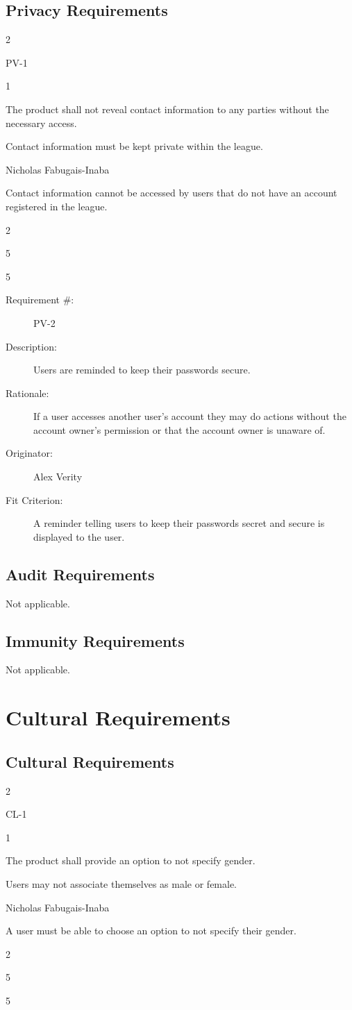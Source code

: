 \documentclass[12pt]{article}
\newenvironment{myreq}[1]{%
\setlist[description]{font=\normalfont\color{darkgray}}%
\begin{tcolorbox}[colframe=black,colback=white, sharp corners, boxrule=1pt]%
\bfseries\color{blue}%
\begin{description}#1}%
{\end{description}\end{tcolorbox}}
\newcommand{\twoinline}[2]{\begin{multicols}{2}#1 #2\end{multicols}}
\newcommand{\reqno}{\item[Requirement \#:]}
\newcommand{\reqevent}{\item[Event/BUC/PUC \#:]}
\newcommand{\reqdesc}{\item[Description:]}
\newcommand{\reqrat}{\item[Rationale:]}
\newcommand{\reqorig}{\item[Originator:]}
\newcommand{\reqfit}{\item[Fit Criterion:]}
\newcommand{\reqsatis}{\item[Customer Satisfaction:]}
\newcommand{\reqdissat}{\item[Customer Dissatisfaction:]}
\begin{document}
\subsection{Privacy Requirements}

\begin{myreq}
  \twoinline
    {\reqno PV-1}
    {\reqevent 1}
  \reqdesc The product shall not reveal contact information to any
  parties without the necessary access.
  \reqrat Contact information must be kept private within the league.
  \reqorig Nicholas Fabugais-Inaba
  \reqfit Contact information cannot be accessed by users that do not have
  an account registered in the league.
  \twoinline
    {\reqsatis 5}
    {\reqdissat 5}
\end{myreq}

\begin{myreq}
  \reqno PV-2
  \reqdesc Users are reminded to keep their passwords secure.
  \reqrat If a user accesses another user's account they may do actions
  without the account owner's permission or that the account owner is unaware
  of.
  \reqorig Alex Verity
  \reqfit A reminder telling users to keep their passwords secret and secure
  is displayed to the user.
  \twoinline
    {\reqsatis 1}
    {\reqdissat 1}
\end{myreq}

\subsection{Audit Requirements}
Not applicable.
\subsection{Immunity Requirements}
Not applicable.

\section{Cultural Requirements}
\subsection{Cultural Requirements}

\begin{myreq}
  \twoinline
    {\reqno CL-1}
    {\reqevent 1}
  \reqdesc The product shall provide an option to not specify gender.
  \reqrat Users may not associate themselves as male or female.
  \reqorig Nicholas Fabugais-Inaba
  \reqfit A user must be able to choose an option to not specify their
  gender.
  \twoinline
    {\reqsatis 5}
    {\reqdissat 5} 
\end{myreq}
\end{document}
